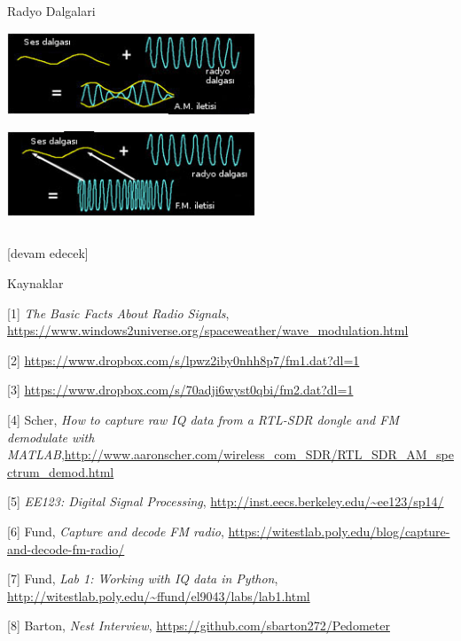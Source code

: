 \documentclass[12pt,fleqn]{article}\usepackage{../../common}
\begin{document}
Radyo Dalgalari

\includegraphics[width=20em]{AM_waves.jpg}

\includegraphics[width=20em]{FM_waves.jpg}

\inputminted[fontsize=\footnotesize]{python}{FMDemodulator.py}

[devam edecek]

Kaynaklar

[1] {\em The Basic Facts About Radio Signals}, \url{https://www.windows2universe.org/spaceweather/wave_modulation.html}

[2] \url{https://www.dropbox.com/s/lpwz2iby0nhh8p7/fm1.dat?dl=1}

[3] \url{https://www.dropbox.com/s/70adji6wyst0qbi/fm2.dat?dl=1}

[4] Scher, {\em How to capture raw IQ data from a RTL-SDR dongle and FM demodulate with MATLAB},\url{http://www.aaronscher.com/wireless_com_SDR/RTL_SDR_AM_spectrum_demod.html}

[5] {\em EE123: Digital Signal Processing}, \url{http://inst.eecs.berkeley.edu/~ee123/sp14/}

[6] Fund, {\em Capture and decode FM radio}, \url{https://witestlab.poly.edu/blog/capture-and-decode-fm-radio/}

[7] Fund, {\em Lab 1: Working with IQ data in Python}, \url{http://witestlab.poly.edu/~ffund/el9043/labs/lab1.html}

[8] Barton, {\em Nest Interview}, \url{https://github.com/sbarton272/Pedometer}
\end{document}
